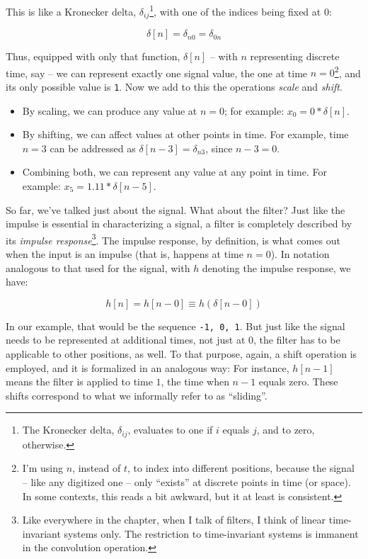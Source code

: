 \documentclass[
  letterpaper,
]{krantz}
\begin{document}
This is like a Kronecker delta, \(\delta_{ij}\)\footnote{The Kronecker
  delta, \(\delta_{ij}\), evaluates to one if \(i\) equals \(j\), and to
  zero, otherwise.}, with one of the indices being fixed at 0:

\[
\delta [n]= \delta _{n0}= \delta _{0n}
\]

Thus, equipped with only that function, \(\delta[n]\) -- with \(n\)
representing discrete time, say -- we can represent exactly one signal
value, the one at time \(n = 0\)\footnote{I'm using \(n\), instead of
  \(t\), to index into different positions, because the signal -- like
  any digitized one -- only ``exists'' at discrete points in time (or
  space). In some contexts, this reads a bit awkward, but it at least is
  consistent.}, and its only possible value is \texttt{1}. Now we add to
this the operations \emph{scale} and \emph{shift}.

\begin{itemize}
\item
  By scaling, we can produce any value at \(n = 0\); for example:
  \(x_0 = 0 * \delta [n]\).
\item
  By shifting, we can affect values at other points in time. For
  example, time \(n = 3\) can be addressed as
  \(\delta [n - 3]= \delta _{n3}\), since \(n - 3 = 0\).
\item
  Combining both, we can represent any value at any point in time. For
  example: \(x_5 = 1.11 * \delta [n - 5]\).
\end{itemize}

So far, we've talked just about the signal. What about the filter? Just
like the impulse is essential in characterizing a signal, a filter is
completely described by its \emph{impulse response}\footnote{Like
  everywhere in the chapter, when I talk of filters, I think of linear
  time-invariant systems only. The restriction to time-invariant systems
  is immanent in the convolution operation.}. The impulse response, by
definition, is what comes out when the input is an impulse (that is,
happens at time \(n = 0\)). In notation analogous to that used for the
signal, with \(h\) denoting the impulse response, we have:

\[
h[n] = h[n- 0] \equiv h(\delta[n- 0]) 
\]

In our example, that would be the sequence \texttt{-1,\ 0,\ 1}. But just
like the signal needs to be represented at additional times, not just at
\(0\), the filter has to be applicable to other positions, as well. To
that purpose, again, a shift operation is employed, and it is formalized
in an analogous way: For instance, \(h[n - 1]\) means the filter is
applied to time \(1\), the time when \(n - 1\) equals zero. These shifts
correspond to what we informally refer to as ``sliding''.
\end{document}
